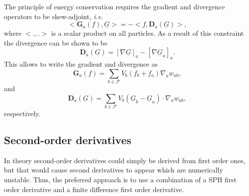 \documentclass[12pt]{memoir}
\newcommand{\uvec}[1]{\underline{#1}}
\newcommand{\ie}{\textit{i.e.}~}
\newcommand{\sumF}{\underset{b \in \mathcal{F}}{\sum}}
\newcommand{\Grad}{\textbf{G}}
\newcommand{\Div}{\textbf{D}}
\begin{document}
The principle of energy conservation requires the gradient and
divergence operators to be skew-adjoint, \ie
\begin{equation}
<\Grad_a(f), \uvec{G}> = - <f, \Div_a(\uvec{G})>,
\label{e:sph:skew-ajd}
\end{equation}
where $<.,.>$ is a scalar product on all particles. As a result of this
constraint the divergence can be shown to be
\begin{equation}
\Div_a(\uvec{G}) = [\nabla \uvec{G}]_a - [\nabla \uvec{G}_a]_a.
\label{e:sph:div-def}
\end{equation}
This allows to write the gradient and divergence as
\begin{equation}
\Grad_a(f) = \sumF V_b (f_b + f_a) \nabla_a w_{ab},
\label{e:sph:grad}
\end{equation}
and
\begin{equation}
\Div_a(\uvec{G}) = \sumF V_b (\uvec{G}_b - \uvec{G}_a) \cdot \nabla_a w_{ab},
\label{e:sph:div}
\end{equation}
respectively.

\subsection{Second-order derivatives}

In theory second-order derivatives could simply be derived from first
order ones, but that would cause second derivatives to appear which are
numerically unstable. Thus, the preferred approach is to use a
combination of a SPH first order derivative and a finite difference
first order derivative.
\end{document}
